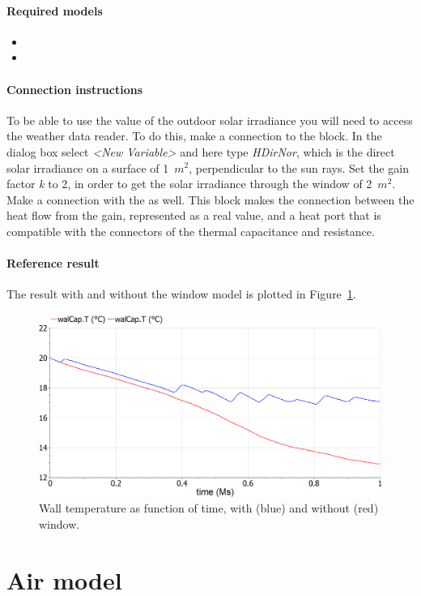 \documentclass[10pt,a4paper]{article}
\begin{document}
\paragraph{Required models}
\begin{itemize}
\item {}
\item {}
\end{itemize}

\paragraph{Connection instructions}
To be able to use the value of the outdoor solar irradiance you will need to access the weather data reader. To do this, make a connection to the  block. In the dialog box select \textit{\textless New Variable\textgreater} and here type \textit{HDirNor}, which is the direct solar irradiance on a surface of 1~$m^2$, perpendicular to the sun rays. Set the gain factor \textit{k} to 2, in order to get the solar irradiance through the window of 2~$m^2$. Make a connection with the  as well. This block makes the connection between the heat flow from the gain, represented as a real value, and a heat port that is compatible with the connectors of the thermal capacitance and resistance. 

\paragraph{Reference result}
The result with and without the window model is plotted in Figure~\ref{fig:res2}.
\begin{figure}[h]
\centering
\includegraphics[width=0.6\columnwidth]{result2.png}
\caption{Wall temperature as function of time, with (blue) and without (red) window.}
\label{fig:res2}
\end{figure}



\newpage
\section{Air model}
\end{document}
